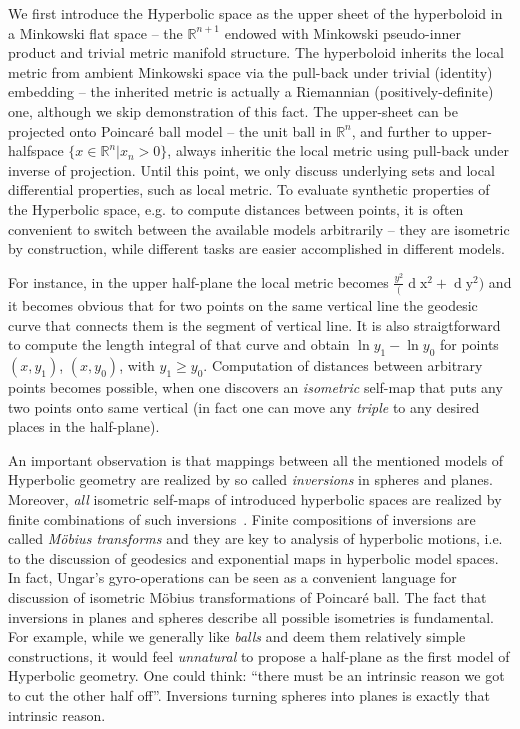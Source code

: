 We first introduce the Hyperbolic space as the upper sheet of the hyperboloid in
a Minkowski flat space -- the \( \mathbb{R}^{n+1} \) endowed with Minkowski
pseudo-inner product and trivial metric manifold structure.
The hyperboloid inherits the local metric from ambient Minkowski space via the
pull-back under trivial (identity) embedding -- the inherited metric is
actually a Riemannian (positively-definite) one, although we skip demonstration
of this fact.
The upper-sheet can be projected onto Poincar\'e ball model -- the unit ball in
\( \mathbb{R}^n \), and further to upper-halfspace
\( \{x\in\mathbb{R}^n\left|x_n > 0 \right. \} \), always inheritic the local
metric using pull-back under inverse of projection.  Until this point, we only
discuss underlying sets and local differential properties, such as local
metric. To evaluate synthetic properties of the Hyperbolic space, e.g. to
compute distances between points, it is often convenient to switch between the
available models arbitrarily -- they are isometric by construction, while
different tasks are easier accomplished in different models.

For instance, in the upper half-plane the local metric becomes \(
\frac{y^2}(\operatorname{d}\mathrm{x}^2 + \operatorname{d}\mathrm{y}^2) \) and
it becomes obvious that for two points on the same vertical line the geodesic
curve that connects them is the segment of vertical line.  It is also
straigtforward to compute the length integral of that curve and obtain \( \ln
y_1 - \ln y_0 \) for points \( (x, y_1) \), \( (x, y_0) \), with \( y_1 \geq
y_0 \). Computation of distances between arbitrary points becomes possible,
when one discovers an \emph{isometric} self-map that puts any two points onto
same vertical (in fact one can move any \emph{triple} to any desired places in
the half-plane).

An important observation is that mappings between all the mentioned models of
Hyperbolic geometry are realized by so called \emph{inversions} in spheres and
planes. Moreover, \emph{all} isometric self-maps of introduced hyperbolic
spaces are realized by finite combinations of such
inversions~\cite{beardonMindaHyp,beardonGeometryDiscrete}. Finite compositions
of inversions are called \emph{M\"obius transforms} and they are key to
analysis of hyperbolic motions, i.e. to the discussion of geodesics and
exponential maps in hyperbolic model spaces. In fact, Ungar's gyro-operations
can be seen as a convenient language for discussion of isometric M\"obius
transformations of Poincar\'e ball.  The fact that inversions in planes and
spheres describe all possible isometries is fundamental. For example, while we
generally like \emph{balls} and deem them relatively simple constructions, it
would feel \emph{unnatural} to propose a half-plane as the first model of
Hyperbolic geometry. One could think: ``there must be an intrinsic reason we
got to cut the other half off''. Inversions turning spheres into planes is
exactly that intrinsic reason.

